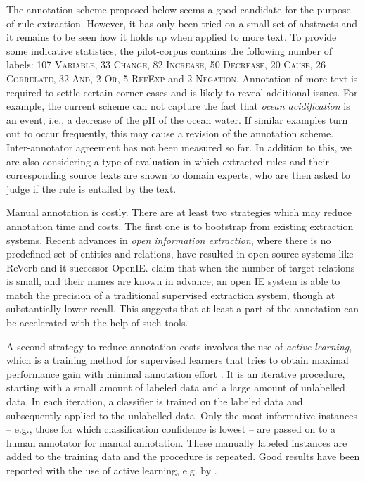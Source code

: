 \documentclass[10pt, a4paper]{article}
\newcommand{\tag}[1]{\textsc{#1}}
\begin{document}
The annotation scheme proposed below seems a good candidate for the purpose of rule extraction.
However, it has only been tried on a small set of abstracts and it remains to be seen how it holds up when applied to more text.
To provide some indicative statistics, the pilot-corpus contains the following number of labels: 107 \tag{Variable}, 33 \tag{Change}, 82 \tag{Increase}, 50 \tag{Decrease}, 20 \tag{Cause}, 26 \tag{Correlate}, 32 \tag{And}, 2 \tag{Or}, 5 \tag{RefExp} and \tag{2 Negation}.
Annotation of more text is required to settle certain corner cases and is likely to reveal additional issues.
For example, the current scheme can not capture the fact that \emph{ocean acidification} is an event, i.e., a decrease of the pH of the ocean water.
If similar examples turn out to occur frequently, this may cause a revision of the annotation scheme. 
Inter-annotator agreement has not been measured so far.
In addition to this, we are also considering a type of evaluation in which extracted rules and their corresponding source texts are shown to domain experts, who are then asked to judge if the rule is entailed by the text. 

Manual annotation is costly. There are at least two strategies which may reduce annotation time and costs. 
The first one is to bootstrap from existing extraction systems.
Recent advances in \emph{open information extraction}, where there is no predefined set of entities and relations, have resulted in open source systems like ReVerb \cite{Fader2011Identifying} and it successor OpenIE.
 claim that when the number of target relations is small, and their
names are known in advance, an open IE system is able to match the precision of a traditional
supervised extraction system, though at substantially lower recall.
This suggests that at least a part of the annotation can be accelerated with the help of such tools.

A second strategy to reduce annotation costs involves the use of \emph{active learning}, which is a training method for supervised learners that tries to obtain maximal performance gain with minimal annotation effort \cite{Olsson09}.
It is an iterative procedure, starting with a small amount of labeled data and a large amount of unlabelled data.
In each iteration, a classifier is trained on the labeled data and subsequently applied to the unlabelled data.
Only the most informative instances -- e.g., those for which classification confidence is lowest -- are passed on to a human annotator for manual annotation.
These manually labeled instances are added to the training data and the procedure is repeated.
Good results have been reported with the use of active learning, e.g. by \cite{gamback2011active}.
\end{document}
